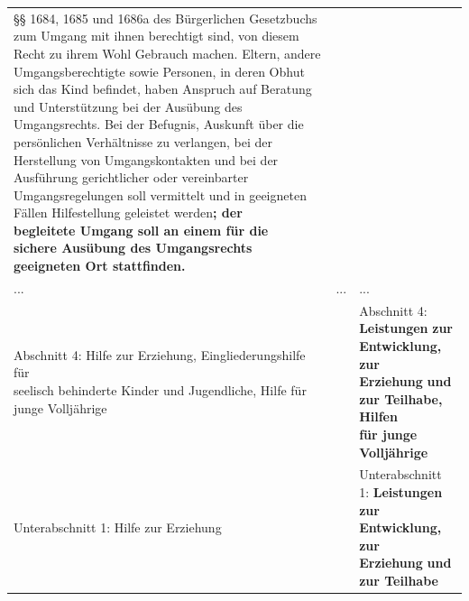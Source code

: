 \documentclass[10pt,a4paper,landscape]{article}
\begin{document}
\begin{longtable}{|L{8.2cm}|L{8.2cm}|L{8.2cm}|}
\S{}\S{} 1684, 1685 und 1686a  \newline des Bürgerlichen Gesetzbuchs zum  \newline Umgang mit ihnen berechtigt sind, von  \newline diesem Recht zu ihrem Wohl Gebrauch  \newline machen. Eltern, andere  \newline Umgangsberechtigte sowie Personen, in  \newline deren Obhut sich das Kind befindet, haben  \newline Anspruch auf Beratung und Unterstützung  \newline bei der Ausübung des Umgangsrechts. Bei  der Befugnis, Auskunft über die  \newline persönlichen Verhältnisse zu verlangen,  \newline bei der Herstellung von Umgangskontakten  \newline und bei der Ausführung gerichtlicher oder  \newline vereinbarter Umgangsregelungen soll  \newline vermittelt und in geeigneten Fällen  \newline Hilfestellung geleistet \textcolor{diffgreen}{werden}\textbf{\textcolor{diffgreen}{; der  \newline begleitete Umgang soll an einem für die  \newline sichere Ausübung des Umgangsrechts  \newline geeigneten Ort stattfinden.}} \\
\hhline{|---|}
... & ... & ... \\
\hhline{|---|}
Abschnitt 4:   \newline \textcolor{diffred}{Hilfe} zur \textcolor{diffred}{Erziehung, Eingliederungshilfe für  \newline seelisch behinderte Kinder} und  \newline \textcolor{diffred}{Jugendliche, Hilfe} für junge Volljährige &  & Abschnitt 4:   \newline \textbf{\textcolor{diffgreen}{Leistungen}}\textbf{ zur }\textbf{\textcolor{diffgreen}{Entwicklung, zur  \newline Erziehung}}\textbf{ und }\textbf{\textcolor{diffgreen}{zur Teilhabe, Hilfen}}\textbf{  \newline für junge Volljährige} \\
\hhline{|---|}
Unterabschnitt 1:   \newline \textcolor{diffred}{Hilfe} zur Erziehung &  & Unterabschnitt 1: \textbf{\textcolor{diffgreen}{Leistungen zur Entwicklung,}}\textbf{ zur  \newline Erziehung }\textbf{\textcolor{diffgreen}{und zur Teilhabe}} \\

\end{longtable}
\end{document}
